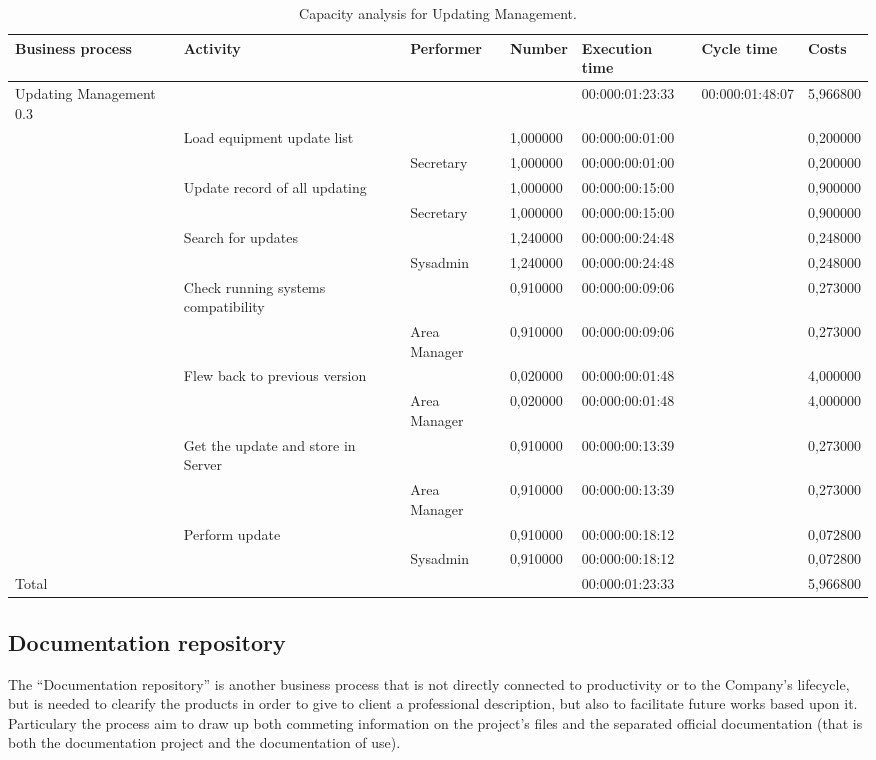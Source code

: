 \begin{landscape}
\begin{table}
\centering
{\tiny
\begin{tabular}{|l|l|l|l|l|l|l|}
Business process&Activity&Performer&Number&Execution time&Cycle time&Costs\\
\hline
Updating Management 0.3&&&&00:000:01:23:33&00:000:01:48:07&5,966800\\
\hline
&Load equipment update list &&1,000000&00:000:00:01:00&&0,200000\\
\hline
&&Secretary &1,000000&00:000:00:01:00&&0,200000\\
\hline
&Update record of all updating &&1,000000&00:000:00:15:00&&0,900000\\
\hline
&&Secretary &1,000000&00:000:00:15:00&&0,900000\\
\hline
&Search for updates &&1,240000&00:000:00:24:48&&0,248000\\
\hline
&&Sysadmin &1,240000&00:000:00:24:48&&0,248000\\
\hline
&Check running systems compatibility &&0,910000&00:000:00:09:06&&0,273000\\
\hline
&&Area Manager &0,910000&00:000:00:09:06&&0,273000\\
\hline
&Flew back to previous version &&0,020000&00:000:00:01:48&&4,000000\\
\hline
&&Area Manager &0,020000&00:000:00:01:48&&4,000000\\
\hline
&Get the update and store in Server &&0,910000&00:000:00:13:39&&0,273000\\
\hline
&&Area Manager &0,910000&00:000:00:13:39&&0,273000\\
\hline
&Perform update &&0,910000&00:000:00:18:12&&0,072800\\
\hline
&&Sysadmin &0,910000&00:000:00:18:12&&0,072800\\
\hline
Total&&&&00:000:01:23:33&&5,966800
\end{tabular}
}
\caption{Capacity analysis for Updating Management.}
\end{table}
\end{landscape}
%

%

\subsection{Documentation repository}
The ``Documentation repository'' is another business process that is not directly connected to productivity or to the Company's lifecycle, but is needed to clearify the products in order to give to client a professional description, but also to facilitate future works based upon it. Particulary the process aim to draw up both commeting information on the project's files and the separated official documentation (that is both the documentation project and the documentation of use).

